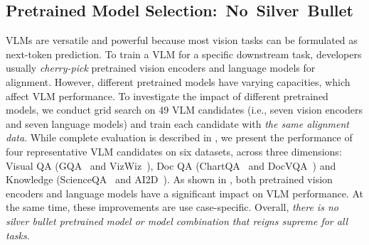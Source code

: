 
\subsection{Pretrained Model Selection:~No~Silver~Bullet}

VLMs are versatile and powerful because most vision tasks can be formulated as next-token prediction. 
To train a VLM for a specific downstream task, developers usually \emph{cherry-pick} pretrained vision encoders and language models for alignment. 
However, different pretrained models have varying capacities, which affect VLM performance. To investigate the impact of different pretrained models, we conduct grid search on 49 VLM candidates (i.e., seven vision encoders and seven language models) and train each candidate with \textit{the same alignment data}. 
While complete evaluation is described in , we present the performance of four representative VLM candidates on six datasets, across three dimensions: Visual QA (GQA~\cite{hudson2019gqa} and VizWiz~\cite{gurari2018vizwiz}), Doc QA (ChartQA~\cite{masry2022chartqa} and DocVQA~\cite{mathew2021docvqa}) and Knowledge (ScienceQA~\cite{lu2022learn} and AI2D~\cite{kembhavi2016diagram}). As shown in , both pretrained vision encoders and language models have a significant impact on VLM performance. 
At the same time, these improvements are use case-specific.
Overall, \textit{there is no silver bullet pretrained model or model combination that reigns supreme for all tasks}. 


